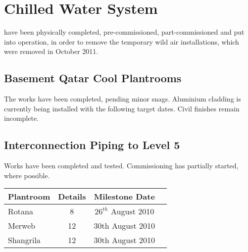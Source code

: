 \chapter{Chilled Water System}
\normalsize

  have been physically completed, pre-commissioned, part-commissioned and put into operation, in order to remove the temporary wild air installations, which were removed in October 2011.

\section{Basement Qatar Cool Plantrooms}
The works have been completed, pending minor snags. Aluminium cladding is currently being installed with the following target dates. Civil finishes remain incomplete.
 
 

\section{Interconnection Piping to Level 5}

Works have been completed and tested. Commissioning has partially started, where possible.
\begin{center} 
    \begin{tabular}{lccl}
      \toprule
      Plantroom   &  Details & Milestone Date  \\
      \midrule
      Rotana       &  8   &  $26^{th}$ August 2010  \\
      Merweb      &  12 &  30th August 2010  \\
      Shangrila    &  12 &  30th August 2010  \\
      \bottomrule
    \end{tabular}
 
  \end{center}
  


